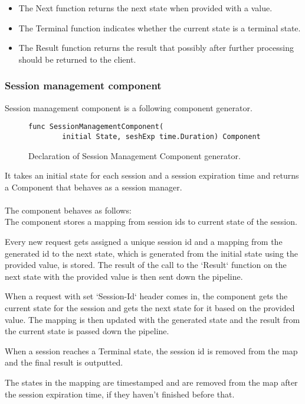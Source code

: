 \documentclass[12pt,a4paper]{article}
\begin{document}
\begin{itemize}
	\item The Next function returns the next state when provided with a value.
	\item The Terminal function indicates whether the current state is a terminal state.
	\item The Result function returns the result that possibly after further 
				processing should be returned to the client.
\end{itemize}

\subsubsection{Session management component}
Session management component is a following component generator.

\begin{figure}[h]
\centering
\begin{lstlisting}
func SessionManagementComponent(
		initial State, seshExp time.Duration) Component
\end{lstlisting}
\caption[scale=1.0]{Declaration of Session Management Component generator.}
\label{fig:seshComp}
\end{figure}

It takes an initial state for each session and a session expiration time and 
returns a Component that behaves as a session manager. 
\\
\\
The component behaves as follows:
\\
The component stores a mapping from session ids to current state of the session.

Every new request gets assigned a unique session id and a mapping from the generated 
id to the next state, which is generated from the initial state using the provided value,
is stored. The result of the call to the `Result` function on the next state with the provided 
value is then sent down the pipeline.

When a request with set `Session-Id` header comes in, the component gets the current 
state for the session and gets the next state for it based on the provided value.
The mapping is then updated with the generated state and the result from the current state
is passed down the pipeline.

When a session reaches a Terminal state, the session id is removed from the map
and the final result is outputted.

The states in the mapping are timestamped and are removed from the map after
the session expiration time, if they haven't finished before that.
\end{document}
